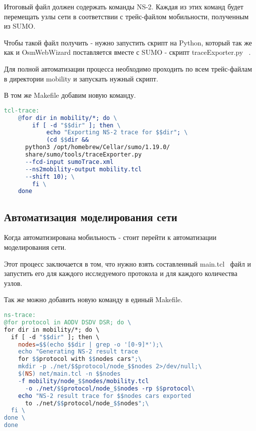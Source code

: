 Итоговый файл должен содержать команды NS-2. Каждая из этих команд будет перемещать узлы сети в соответствии с трейс-файлом мобильности, полученным из SUMO.

Чтобы такой файл получить - нужно запустить скрипт на Python, который так же как и OsmWebWizard поставляется вместе с SUMO - скрипт traceExporter.py ~\cite{traceexporter}.

Для полной автоматизации процесса необходимо проходить по всем трейс-файлам в директории mobility и запускать нужный скрипт.

В том же Makefile добавим новую команду.

\begin{lstlisting}[language=make, style=mystyle, caption=Makefile для конвертации трейс-файла]
tcl-trace:
	@for dir in mobility/*; do \
		if [ -d "$$dir" ]; then \
			echo "Exporting NS-2 trace for $$dir"; \
			(cd $$dir && 
      python3 /opt/homebrew/Cellar/sumo/1.19.0/
      share/sumo/tools/traceExporter.py 
      --fcd-input sumoTrace.xml 
      --ns2mobility-output mobility.tcl 
      --shift 10); \
		fi \
	done
\end{lstlisting}

\subsection*{Автоматизация моделирования сети}

Когда автоматизирована мобильность - стоит перейти к автоматизации моделирования сети.

Этот процесс заключается в том, что нужно взять составленный main.tcl~\cite{ns2_examples} файл и запустить его для каждого исследуемого протокола и для каждого количества узлов.

Так же можно добавить новую команду в единый Makefile.

\begin{lstlisting}[language=make, style=mystyle, caption=Makefile для запуска симуляции сети]
ns-trace:
@for protocol in AODV DSDV DSR; do \
for dir in mobility/*; do \
  if [ -d "$$dir" ]; then \
    nodes=$$(echo $$dir | grep -o '[0-9]*');\
    echo "Generating NS-2 result trace 
    for $$protocol with $$nodes cars";\
    mkdir -p ./net/$$protocol/node_$$nodes 2>/dev/null;\
    $(NS) net/main.tcl -n $$nodes 
    -f mobility/node_$$nodes/mobility.tcl
      -o ./net/$$protocol/node_$$nodes -rp $$protocol\
    echo "NS-2 result trace for $$nodes cars exported
      to ./net/$$protocol/node_$$nodes";\
  fi \
done \
done
\end{lstlisting}

